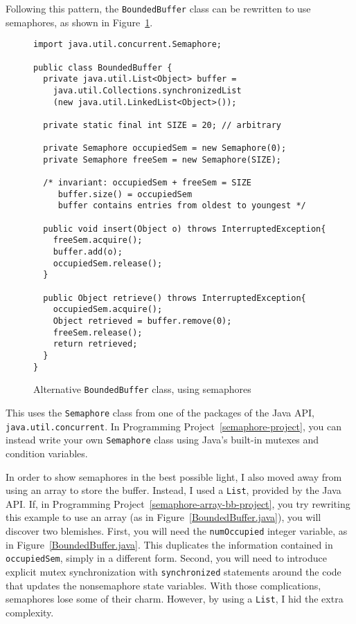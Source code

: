 Following this pattern, the \verb|BoundedBuffer| class can be
  rewritten to use
semaphores, as shown in Figure~\ref{SemaphoreBoundedBuffer.java}.
\begin{figure}
\begin{verbatim}
import java.util.concurrent.Semaphore;

public class BoundedBuffer {
  private java.util.List<Object> buffer =
    java.util.Collections.synchronizedList
    (new java.util.LinkedList<Object>());

  private static final int SIZE = 20; // arbitrary

  private Semaphore occupiedSem = new Semaphore(0);
  private Semaphore freeSem = new Semaphore(SIZE);

  /* invariant: occupiedSem + freeSem = SIZE
     buffer.size() = occupiedSem
     buffer contains entries from oldest to youngest */

  public void insert(Object o) throws InterruptedException{
    freeSem.acquire();
    buffer.add(o);
    occupiedSem.release();
  }

  public Object retrieve() throws InterruptedException{
    occupiedSem.acquire();
    Object retrieved = buffer.remove(0);
    freeSem.release();
    return retrieved;
  }
}
\end{verbatim}
\caption{Alternative {\tt BoundedBuffer} class, using semaphores}
\label{SemaphoreBoundedBuffer.java}
\end{figure}
This uses the \texttt{Semaphore} class from one of the
packages of the Java API, \texttt{java.util.concurrent}.
In
Programming Project~\ref{semaphore-project}, you can instead write your own {\tt Semaphore} class using Java's built-in mutexes and
condition variables.

In order to show semaphores in the best possible light, I also moved
away from using an array to store the buffer.  Instead, I used a
\texttt{List}, provided by the Java API.  If, in Programming Project~\ref{semaphore-array-bb-project}, you try rewriting
this example to use an array (as in Figure~\ref{BoundedBuffer.java}),
you will discover two blemishes.  First, you will need the
\verb|numOccupied| integer variable, as in Figure~\ref{BoundedBuffer.java}.  This duplicates the information contained in
\verb|occupiedSem|, simply in a different form.  Second, you will need
to introduce explicit mutex synchronization with \verb|synchronized|
statements around the code that updates the nonsemaphore state
variables.  With those complications, semaphores lose some of their
charm.  However, by using a \texttt{List}, I hid the extra complexity.

